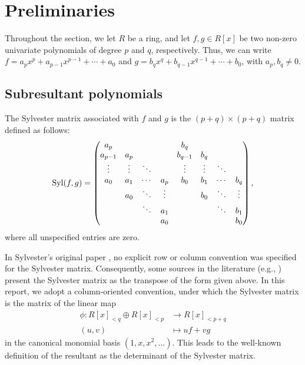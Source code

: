 \section{Preliminaries}

Throughout the section, we let $R$ be a ring, and let $f,g\in R[x]$ be two non-zero univariate polynomials of degree $p$ and $q$, respectively. Thus, we can write $f=a_p x^p + a_{p-1} x^{p-1} + \cdots + a_0$ and $g=b_q x^q + b_{q-1} x^{q-1} + \cdots + b_0$, with $a_p, b_q \neq 0$.

\subsection{Subresultant polynomials}

\begin{definition}
    The Sylvester matrix associated with $f$ and $g$ is the $(p+q)\times(p+q)$ matrix defined as follows:
    \begin{equation*}
        \operatorname{Syl}(f,g)=
        \begin{pmatrix}
            a_p     &        &        &        & b_q     &        &        &        \\
            a_{p-1} & a_p    &        &        & b_{q-1} & b_q    &        &        \\
            \vdots  & \vdots & \ddots &        & \vdots  & \vdots & \ddots &        \\
            a_0     & a_1    & \cdots & a_p    & b_0     & b_1    & \cdots & b_q    \\
                    & a_0    & \ddots & \vdots &         & b_0    & \ddots & \vdots \\
                    &        & \ddots & a_1    &         &        & \ddots & b_1    \\
                    &        &        & a_0    &         &        &        & b_0
        \end{pmatrix},
    \end{equation*}
    where all unspecified entries are zero.
\end{definition}

In Sylvester's original paper \cite{sylvester1853xviii}, no explicit row or column convention was specified for the Sylvester matrix. Consequently, some sources in the literature (e.g., \cite{basu2006algorithms}) present the Sylvester matrix as the transpose of the form given above. In this report, we adopt a column-oriented convention, under which the Sylvester matrix is the matrix of the linear map
\begin{align*}
    \phi : R[x]_{<q} \oplus R[x]_{<p} & \to R[x]_{<p+q} \\
    (u,v)                             & \mapsto uf + vg
\end{align*}
in the canonical monomial basis $(1,x,x^2,\ldots)$. This leads to the well-known definition of the resultant as the determinant of the Sylvester matrix.

